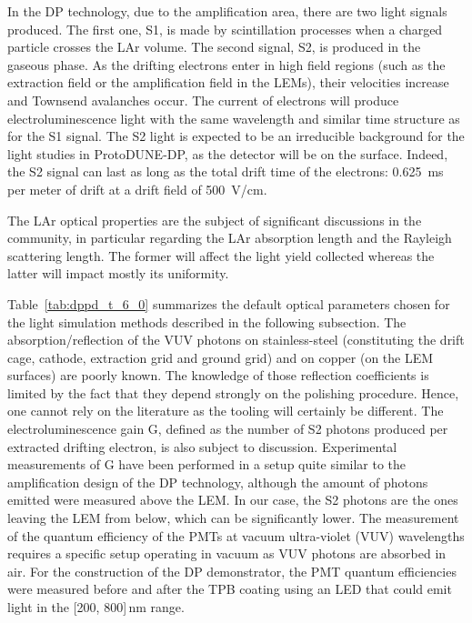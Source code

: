 In the DP technology, due to the amplification area, there are two light signals produced. The first one, S1, is made by scintillation processes when a charged particle crosses the LAr volume. The second signal, S2, is produced in the gaseous phase. As the drifting electrons enter in high field regions (such as the extraction field or the amplification field in the LEMs), their velocities increase and Townsend avalanches occur. The current of electrons will produce electroluminescence light with the same wavelength and similar time structure as for the S1 signal. %
The S2 light is expected to be an irreducible background for the light studies in ProtoDUNE-DP, as the detector will be on the surface. Indeed, the S2 signal can last as long as the total drift time of the electrons: \SI{0.625}{ms} per meter of drift at a drift field of \SI{500}{V/cm}.

The LAr optical properties are the subject of significant discussions in the community, in particular regarding the LAr absorption length and the Rayleigh scattering length. The former will affect the light yield collected whereas the latter will impact mostly its uniformity. 

Table~\ref{tab:dppd_t_6_0} summarizes the default optical parameters chosen for the light simulation methods described in the following subsection. The absorption/reflection of the VUV photons on stainless-steel (constituting the drift cage, cathode, extraction grid and ground grid) and on copper (on the LEM surfaces) are poorly known. The knowledge of those reflection coefficients is limited by the fact that they depend strongly on the polishing procedure. Hence, one cannot rely on the literature as the tooling will certainly be different. The electroluminescence gain G, defined as the number of S2 photons produced per extracted drifting electron, is also subject to discussion. Experimental measurements of G have been performed in a setup quite similar to the amplification design of the DP technology, although the amount of photons emitted were measured above the LEM. In our case, the S2 photons are the ones leaving the LEM from below, which can be significantly lower. The measurement of the quantum efficiency of the PMTs at vacuum ultra-violet (VUV) wavelengths requires a specific setup operating in vacuum as VUV photons are absorbed in air. For the construction of the DP demonstrator, the PMT quantum efficiencies were measured before and after the TPB coating using an LED that could emit light in the [\num{200}, \num{800}]\,nm range.

